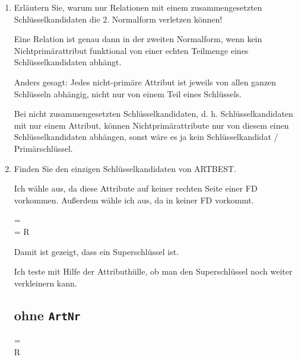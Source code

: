 \documentclass{lehramt-informatik-aufgabe}
\begin{document}
\begin{enumerate}


\item Erläutern Sie, warum nur Relationen mit einem zusammengesetzten
Schlüsselkandidaten die 2. Normalform verletzen
können!

\begin{liAntwort}
Eine Relation ist genau dann in der zweiten Normalform, wenn kein
Nichtprimärattribut funktional von einer echten Teilmenge eines
Schlüsselkandidaten abhängt.

Anders gesagt: Jedes nicht-primäre Attribut ist jeweils von
allen ganzen Schlüsseln abhängig, nicht nur von einem Teil
eines Schlüssels.

Bei nicht zusammengesetzten Schlüsselkandidaten, d. h.
Schlüsselkandidaten mit nur einem Attribut, können Nichtprimärattribute
nur von diesem einen Schlüsselkandidaten abhängen,
sonst wäre es ja kein Schlüsselkandidat / Primär\-schlüssel.
\end{liAntwort}


\item Finden Sie den einzigen
Schlüsselkandidaten von ARTBEST.

\begin{liAntwort}
Ich wähle  aus, da diese Attribute auf
keiner rechten Seite einer FD vorkommen. Außerdem wähle ich 
aus, da  in keiner FD vorkommt.

\begin{liAHuelle}
 = \\
 = R
\end{liAHuelle}

Damit ist gezeigt, dass  ein
Superschlüssel ist.

Ich teste mit Hilfe der Attributhülle, ob man den Superschlüssel noch
weiter verkleinern kann.

\subsection*{ohne \texttt{ArtNr}}

\begin{liAHuelle}
 = \\
 \neq R
\end{liAHuelle}

\end{liAntwort}
\end{enumerate}
\end{document}

